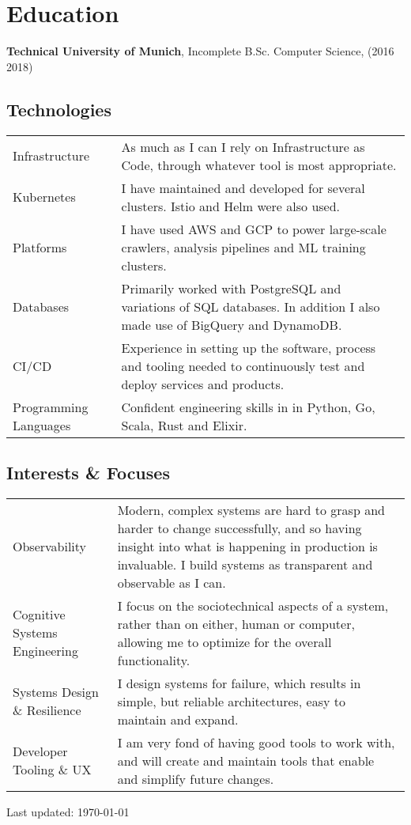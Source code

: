 \documentclass[a4paper]{article}
\renewenvironment{itemize}{
  \begin{list}{}{
      \setlength{\leftmargin}{1em}
      \setlength{\itemsep}{3pt}
  }
}{
  \end{list}
}
\begin{document}
\section*{Education}

\begin{itemize}
  \item \textbf{Technical University of Munich}, Incomplete B.Sc. Computer Science,  (2016
    {\textendash} 2018)
\end{itemize}

\subsection*{Technologies}
\begin{tabular}{ p{3cm} | p{13.75cm} }
  Infrastructure & As much as I can I rely on Infrastructure as Code, through
                   whatever tool is most appropriate.\\
  Kubernetes & I have maintained and developed for several clusters. Istio and
               Helm were also used.\\
  Platforms & I have used AWS and GCP to power large-scale crawlers, analysis pipelines and ML
              training clusters. \\
  Databases & Primarily worked with PostgreSQL and variations of SQL
              databases. In addition I also made use of BigQuery and DynamoDB.\\
  CI/CD & Experience in setting up the software, process and tooling needed
          to continuously test and deploy services and products.\\
  Programming Languages & Confident engineering skills in in Python, Go, Scala, Rust and Elixir.
\end{tabular}

\subsection*{Interests \& Focuses}
\begin{tabular}{ p{3cm} | p{13.75cm} }
  Observability & Modern, complex systems are hard to grasp and harder to change
                  successfully, and so having insight into what is happening in production is
                  invaluable. I build systems as transparent and observable as I
                  can. \\
  Cognitive Systems Engineering & I focus on the sociotechnical aspects of a
                                  system, rather than on either, human or
                                  computer, allowing me to optimize for the
                                  overall functionality. \\
  Systems Design \& Resilience & I design systems for failure, which results in simple,
                                 but reliable architectures, easy to maintain and expand.\\
  Developer Tooling \& UX & I am very fond of having good tools to work with, and will create and
            maintain tools that enable and simplify future changes. \\
\end{tabular}

\vfill

\begin{center}
  \begin{footnotesize}
    Last updated: \today
  \end{footnotesize}
\end{center}
\end{document}
